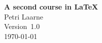\documentclass[a4paper, 11pt]{report}
\begin{document}
\begin{titlepage}

\hrulefill

\begin{flushright}
\textbf{\LARGE A second course in \LaTeX}\\[1em]
\Large Petri Laarne\\[1em]
Version~1.0\\
\today
\end{flushright}

\hrulefill

\end{titlepage}

\tableofcontents













\printindex
\printbibliography


\end{document}
